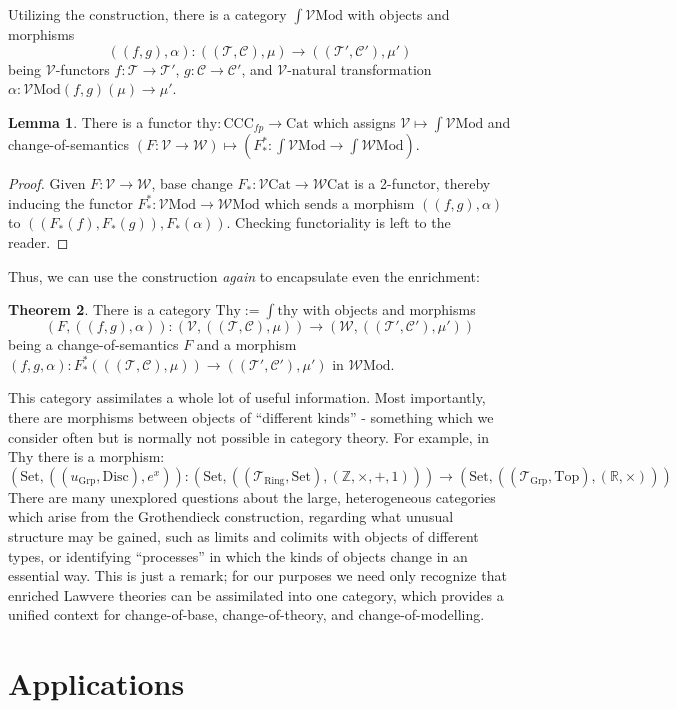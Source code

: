 \documentclass[a4paper,UKenglish]{article}
\theoremstyle{definition}
\newtheorem{theorem}{Theorem}
\newtheorem{lemma}[theorem]{Lemma}
\newcommand{\Set}{\mathrm{Set}}
\newcommand{\Grp}{\mathrm{Grp}}
\newcommand{\Cat}{\mathrm{Cat}}
\newcommand{\Top}{\mathrm{Top}}
\newcommand{\CCC}{\mathrm{CCC}}
\newcommand{\Mod}{\mathrm{Mod}}
\newcommand{\V}{\mathscr{V}}
\newcommand{\W}{\mathscr{W}}
\newcommand{\C}{\mathscr{C}}
\newcommand{\T}{\mathscr{T}}
\begin{document}
Utilizing the construction, there is a category \textbf{$\int \V\Mod$} with objects and morphisms $$((f,g),\alpha): ((\T,\C),\mu) \to ((\T',\C'),\mu')$$ being $\V$-functors $f:\T\to \T'$, $g:\C\to \C'$, and $\V$-natural transformation $\alpha:\V\Mod(f,g)(\mu)\to \mu'$.

\begin{lemma}
	There is a functor $\mathrm{thy}: \CCC_{fp} \to \Cat$ which assigns $\V \mapsto \int \V\Mod$ and change-of-semantics $(F: \V \to \W) \mapsto (F_*^*: \int \V\Mod \to \int \W\Mod)$.
\end{lemma}
\begin{proof}
	Given $F:\V\to \W$, base change $F_*: \V\Cat \to \W\Cat$ is a 2-functor, thereby inducing the functor $F_*^*:\V\Mod\to \W\Mod$ which sends a morphism $((f,g),\alpha)$ to $((F_*(f),F_*(g)),F_*(\alpha))$. Checking functoriality is left to the reader.
\end{proof}

Thus, we can use the construction \textit{again} to encapsulate even the enrichment:
\begin{theorem}
	There is a category $\mathrm{Thy} := \int \mathrm{thy}$ with objects and morphisms $$(F,((f,g),\alpha)): (\V,((\T,\C),\mu)) \to (\W,((\T',\C'),\mu'))$$ being a change-of-semantics $F$ and a morphism $(f,g,\alpha): F_*^*(((\T,\C),\mu)) \to ((\T',\C'),\mu')$ in $\W\Mod$.
\end{theorem}

This category assimilates a whole lot of useful information. Most importantly, there are morphisms between objects of ``different kinds'' - something which we consider often but is normally not possible in category theory. For example, in $\mathrm{Thy}$ there is a morphism: $$(\Set, ((u_{\Grp}, \mathrm{Disc}), e^x)): (\Set,((\T_{\mathrm{Ring}},\Set),(\mathbb{Z},\times,+,1))) \to (\Set,((\T_\Grp,\Top),(\mathbb{R},\times)))$$
There are many unexplored questions about the large, heterogeneous categories which arise from the Grothendieck construction, regarding what unusual structure may be gained, such as limits and colimits with objects of different types, or identifying ``processes'' in which the kinds of objects change in an essential way. This is just a remark; for our purposes we need only recognize that enriched Lawvere theories can be assimilated into one category, which provides a unified context for change-of-base, change-of-theory, and change-of-modelling.

\section{Applications}
\end{document}

